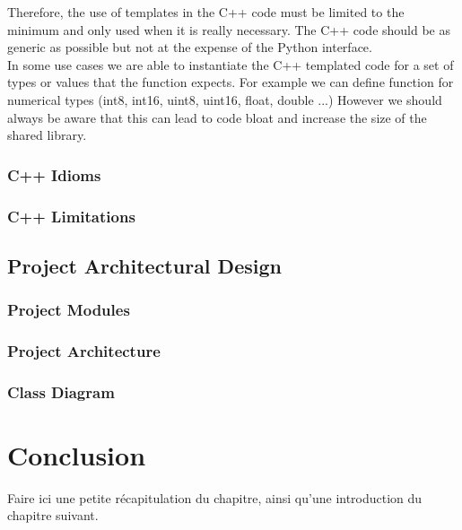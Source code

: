 \begin{spacing}{1.2}
    Therefore, the use of templates in the C++ code must be limited to the minimum and only used
    when it is really necessary. The C++ code should be as generic as possible but not at the
    expense of the Python interface.\\

    In some use cases we are able to instantiate the C++ templated code for a set of types or values
    that the function expects. For example we can define function for numerical types (int8, int16, uint8, uint16, float, double ...)
    However we should always be aware that this can lead to code bloat and increase the size
    of the shared library.\\





    \subsubsection{C++ Idioms}
    
    \subsubsection{C++ Limitations}
    \subsection{Project Architectural Design}
    \subsubsection{Project Modules}
    \subsubsection{Project Architecture}
    \subsubsection{Class Diagram}


    \section*{Conclusion}
    Faire ici une petite récapitulation du chapitre, ainsi qu'une introduction du chapitre suivant.





\end{spacing}
